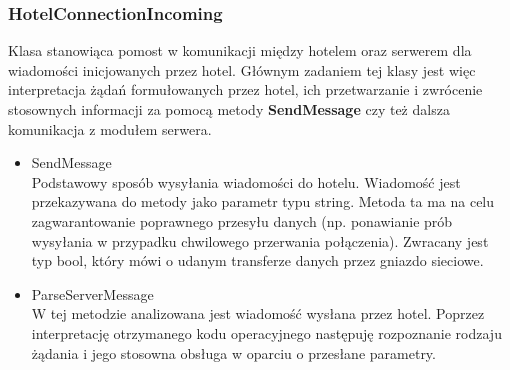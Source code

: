 \documentclass{article}
\begin{document}
\subsubsection{HotelConnectionIncoming}
Klasa stanowiąca pomost w komunikacji między hotelem oraz serwerem dla wiadomości inicjowanych przez hotel. Głównym zadaniem tej klasy jest więc interpretacja żądań formułowanych przez hotel, ich przetwarzanie i zwrócenie stosownych informacji za pomocą metody \textbf{SendMessage} czy też dalsza komunikacja z modułem serwera. 
\begin{itemize}
    \item SendMessage\\
    Podstawowy sposób wysyłania wiadomości do hotelu. Wiadomość jest przekazywana do metody jako parametr typu string. Metoda ta ma na celu zagwarantowanie poprawnego przesyłu danych (np. ponawianie prób wysyłania w przypadku chwilowego przerwania połączenia). Zwracany jest typ bool, który mówi o udanym transferze danych przez gniazdo sieciowe.
    \item ParseServerMessage\\
    W tej metodzie analizowana jest wiadomość wysłana przez hotel. Poprzez interpretację  otrzymanego kodu operacyjnego następuję rozpoznanie rodzaju żądania i jego stosowna obsługa w oparciu o przesłane parametry.  
\end{itemize}
\end{document}
